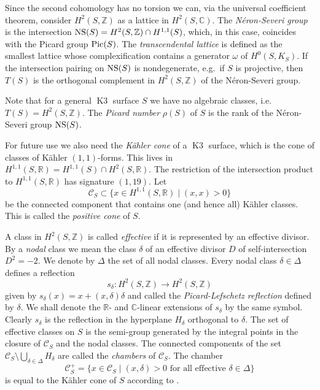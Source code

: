 \documentclass[a4paper,11pt]{article}
\newcommand{\CC}{\mathbb C}
\newcommand{\RR}{\mathbb R}
\newcommand{\ZZ}{\mathbb Z}
\newcommand{\cC}{\mathcal C}
\newcommand{\NS}{\mathop{\null\mathrm {NS}}\nolimits}
\newcommand{\Pic}{\mathop{\null\mathrm {Pic}}\nolimits}
\newcommand{\Kthree}{\mathop{\mathrm {K3}}\nolimits}
\begin{document}
Since the second cohomology has no torsion we can, via the universal
coefficient theorem, consider $H^2(S,\ZZ)$ as a lattice in
$H^2(S,\CC)$.  The \emph{N\'eron-Severi group} is the intersection
$\NS(S)=H^2(S,\ZZ) \cap H^{1,1}(S)$, which, in this case, coincides
with the Picard group $\Pic(S)$. The \emph{transcendental lattice} is
defined as the smallest lattice whose complexification contains a
generator $\omega$ of $H^0(S,K_S)$.  If the intersection pairing on
$\NS(S)$ is nondegenerate, e.g.\ if $S$ is projective, then $T(S)$ is
the orthogonal complement in $H^2(S,\ZZ)$ of the N\'eron-Severi group.

Note that for a general $\Kthree$ surface $S$ we have no algebraic
classes, i.e.\ $T(S)=H^2(S,\ZZ)$.  The \emph{Picard number} $\rho(S)$
of $S$ is the rank of the N\'eron-Severi group $\NS(S)$.

For future use we also need the \emph{K\"ahler cone} of a $\Kthree$
surface, which is the cone of classes of K\"ahler $(1,1)$-forms. This
lives in $H^{1,1}(S,\RR)=H^{1,1}(S) \cap H^2(S,\RR)$.  The restriction
of the intersection product to $H^{1,1}(S,\RR)$ has signature
$(1,19)$.  Let
\begin{equation*}
\cC_S\subset \{ x \in H^{1,1}(S,\RR) \mid (x,x) >0 \}
\end{equation*}
be the connected component that contains one (and hence
all) K\"ahler classes. This is called the \emph{positive cone} of $S$.

A class in $H^2(S,\ZZ)$ is called \emph{effective} if it is represented
by an effective divisor.  By a \emph{nodal} class we mean the class
$\delta$ of an effective divisor $D$ of self-intersection $D^2=-2$.
We denote by $\Delta$ the set of all nodal classes.  Every nodal class
$\delta \in \Delta$ defines a reflection
\begin{equation*}
s_\delta\colon  H^2(S,\ZZ) \to H^2(S,\ZZ)
\end{equation*}
given by $s_\delta(x)=x+(x,\delta)\delta$ and called the
\emph{Picard-Lefschetz reflection} defined by $\delta$. We shall
denote the $\RR$- and $\CC$-linear extensions of $s_\delta$ by the
same symbol. Clearly $s_\delta$ is the reflection in the hyperplane
$H_\delta$ orthogonal to $\delta$.  The set of effective classes on
$S$ is the semi-group generated by the integral points in the closure
of $\cC_S$ and the nodal classes.  The connected components of the set
$\cC_S \setminus \bigcup_{\delta \in \Delta} H_\delta$ are called the
\emph{chambers} of $\cC_S$. The chamber
\begin{equation}\label{kaehlercone}
\cC_S^+= \{ x \in \cC_S \mid (x,\delta)>0 \mbox{ for all effective } \delta\in\Delta \}
\end{equation}
is equal to the K\"ahler cone of $S$ according to \cite[Corollary VIII.3.9]{BHPV}.
\end{document}
